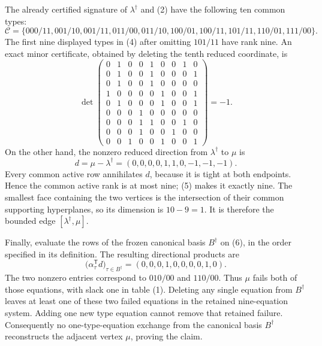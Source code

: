 The already certified signature of \(\lambda^\dagger\) and (2) have the following ten common types:
\[\mathcal C=\{000/11,001/10,001/11,011/00,011/10,100/01,100/11,101/11,110/01,111/00\}.\tag{4}\]
The first nine displayed types in (4) after omitting \(101/11\) have rank nine. An exact minor certificate, obtained by deleting the tenth reduced coordinate, is
\[\det\begin{pmatrix}0&1&0&0&1&0&0&1&0\\0&1&0&0&1&0&0&0&1\\0&1&0&0&1&0&0&0&0\\1&0&0&0&0&1&0&0&1\\0&1&0&0&0&1&0&0&1\\0&0&0&1&0&0&0&0&0\\0&0&0&1&1&0&0&1&0\\0&0&0&1&0&0&1&0&0\\0&0&1&0&0&1&0&0&1\end{pmatrix}=-1.\tag{5}\]
On the other hand, the nonzero reduced direction from \(\lambda^\dagger\) to \(\mu\) is
\[d=\mu-\lambda^\dagger=(0,0,0,0,1,1,0,-1,-1,-1).\tag{6}\]
Every common active row annihilates \(d\), because it is tight at both endpoints. Hence the common active rank is at most nine; (5) makes it exactly nine. The smallest face containing the two vertices is the intersection of their common supporting hyperplanes, so its dimension is \(10-9=1\). It is therefore the bounded edge \([\lambda^\dagger,\mu]\).

Finally, evaluate the rows of the frozen canonical basis \(B^\dagger\) on (6), in the order specified in its definition. The resulting directional products are
\[\bigl(\alpha_\tau^{\mathsf T}d\bigr)_{\tau\in B^\dagger}=(0,0,0,1,0,0,0,0,1,0).\tag{7}\]
The two nonzero entries correspond to \(010/00\) and \(110/00\). Thus \(\mu\) fails both of those equations, with slack one in table (1). Deleting any single equation from \(B^\dagger\) leaves at least one of these two failed equations in the retained nine-equation system. Adding one new type equation cannot remove that retained failure. Consequently no one-type-equation exchange from the canonical basis \(B^\dagger\) reconstructs the adjacent vertex \(\mu\), proving the claim.